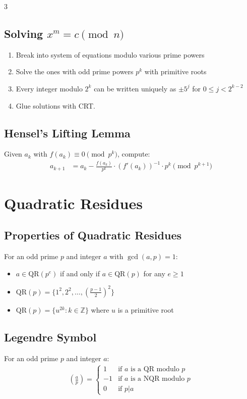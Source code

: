 \documentclass[8,a4paper]{article}
\newcommand{\QR}{\text{QR}}
\begin{document}
\begin{multicols}{3}
	\subsection{Solving $x^m = c \pmod{n}$}
	\begin{enumerate}
		\item Break into system of equations modulo various prime powers
		\item Solve the ones with odd prime powers $p^k$ with primitive roots
		\item Every integer modulo $2^k$ can be written uniquely as $\pm 5^j$ for $0 \leq j < 2^{k-2}$
		\item Glue solutions with CRT.
	\end{enumerate}

	\subsection{Hensel's Lifting Lemma}

	Given $a_k$ with $f(a_k) \equiv 0 \pmod{p^k}$, compute:
	\begin{align*}
		a_{k+1} & = a_k - \frac{f(a_k)}{p^k} \cdot (f'(a_k))^{-1} \cdot p^k \pmod{p^{k+1}}
	\end{align*}

	\section{Quadratic Residues}

	\subsection{Properties of Quadratic Residues}
	For an odd prime $p$ and integer $a$ with $\gcd(a,p) = 1$:
	\begin{itemize}[leftmargin=*]
		\item $a \in \QR(p^e)$ if and only if $a \in \QR(p)$ for any $e \geq 1$
		\item $\QR(p) = \{1^2, 2^2, \ldots, (\frac{p-1}{2})^2\}$
		\item $\QR(p) = \{u^{2k}: k \in \mathbb{Z}\}$ where $u$ is a primitive root
	\end{itemize}

	\subsection{Legendre Symbol}
	For an odd prime $p$ and integer $a$:
	\begin{align*}
		\left(\frac{a}{p}\right) =
		\begin{cases}
			1  & \text{if } a \text{ is a QR modulo } p  \\
			-1 & \text{if } a \text{ is a NQR modulo } p \\
			0  & \text{if } p | a
		\end{cases}
	\end{align*}


\end{multicols}
\end{document}
